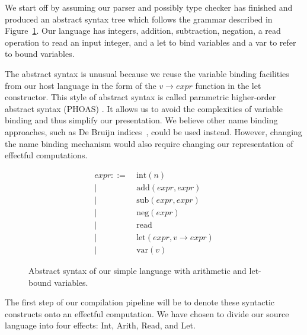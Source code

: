 \documentclass[a4paper,UKenglish,cleveref, autoref, thm-restate, anonymous]{oasics-v2021}
\begin{document}
We start off by assuming our parser and possibly type checker has finished and produced an abstract syntax tree which follows the grammar described in Figure~\ref{fig:source-absyn}.
Our language has integers, addition, subtraction, negation, a read operation to read an input integer, and a let to bind variables and a var to refer to bound variables.

The abstract syntax is unusual because we reuse the variable binding facilities from our host language in the form of the $\mathit{v} \to \mathit{expr}$ function in the let constructor.
This style of abstract syntax is called parametric higher-order abstract syntax (PHOAS) \cite{10.1145/1411203.1411226}.
It allows us to avoid the complexities of variable binding and thus simplify our presentation.
We believe other name binding approaches, such as De Bruijn indices~\cite{DEBRUIJN1972381}, could be used instead.
However, changing the name binding mechanism would also require changing our representation of effectful computations.

\begin{figure}[ht]
  \begin{align*}
    \mathit{expr} ::= &\ \mathrm{int}(n) \\
           | &\ \mathrm{add}(\mathit{expr},\mathit{expr}) \\
           | &\ \mathrm{sub}(\mathit{expr},\mathit{expr}) \\
           | &\ \mathrm{neg}(\mathit{expr}) \\
           | &\ \mathrm{read} \\
           | &\ \mathrm{let}(\mathit{expr}, \mathit{v} \to \mathit{expr}) \\
           | &\ \mathrm{var}(\mathit{v})
  \end{align*}
  \caption{Abstract syntax of our simple language with arithmetic and let-bound variables.}\label{fig:source-absyn}
\end{figure}

The first step of our compilation pipeline will be to denote these syntactic constructs onto an effectful computation.
We have chosen to divide our source language into four effects: Int, Arith, Read, and Let.
\end{document}
